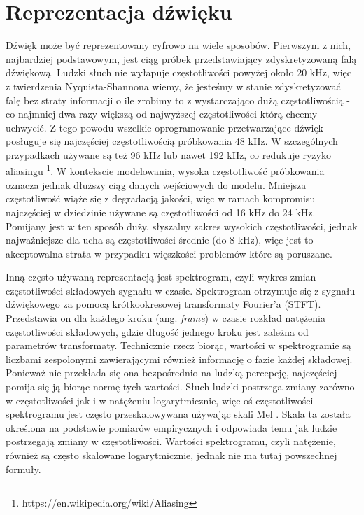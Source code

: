 \documentclass[magisterska]{pracamgr}
\begin{document}
\section{Reprezentacja dźwięku}

Dźwięk może być reprezentowany cyfrowo na wiele sposobów. Pierwszym z nich, najbardziej podstawowym, jest ciąg próbek przedstawiający zdyskretyzowaną falą dźwiękową. Ludzki słuch nie wyłapuje częstotliwości powyżej około 20 kHz, więc z twierdzenia Nyquista-Shannona \cite{shannon49} wiemy, że jesteśmy w stanie zdyskretyzować falę bez straty informacji o ile zrobimy to z wystarczająco dużą częstotliwością - co najmniej dwa razy większą od najwyższej częstotliwości którą chcemy uchwycić. Z tego powodu wszelkie oprogramowanie przetwarzające dźwięk posługuje się najczęściej częstotliwością próbkowania 48 kHz. W szczególnych przypadkach używane są też 96 kHz lub nawet 192 kHz, co redukuje ryzyko aliasingu \footnote{https://en.wikipedia.org/wiki/Aliasing}. W kontekscie modelowania, wysoka częstotliwość próbkowania oznacza jednak dłuższy ciąg danych wejściowych do modelu. Mniejsza częstotliwość wiąże się z degradacją jakości, więc w ramach kompromisu najczęściej w dziedzinie używane są częstotliwości od 16 kHz do 24 kHz. Pomijany jest w ten sposób duży, słyszalny zakres wysokich częstotliwości, jednak najważniejsze dla ucha są częstotliwości średnie (do 8 kHz), więc jest to akceptowalna strata w przypadku więszkości problemów które są poruszane.

Inną często używaną reprezentacją jest spektrogram, czyli wykres zmian częstotliwości składowych sygnału w czasie. Spektrogram otrzymuje się z sygnału dźwiękowego za pomocą krótkookresowej transformaty Fourier'a (STFT). Przedstawia on dla każdego kroku (ang. \textit{frame}) w czasie rozkład natężenia częstotliwości składowych, gdzie długość jednego kroku jest zależna od parametrów transformaty. Technicznie rzecz biorąc, wartości w spektrogramie są liczbami zespolonymi zawierającymi również informację o fazie każdej składowej. Ponieważ nie przekłada się ona bezpośrednio na ludzką percepcję, najczęściej pomija się ją biorąc normę tych wartości. Słuch ludzki postrzega zmiany zarówno w częstotliwości jak i w natężeniu logarytmicznie, więc oś częstotliwości spektrogramu jest często przeskalowywana używając skali Mel \cite{melscale}. Skala ta została określona na podstawie pomiarów empirycznych i odpowiada temu jak ludzie postrzegają zmiany w częstotliwości. Wartości spektrogramu, czyli natężenie, również są często skalowane logarytmicznie, jednak nie ma tutaj powszechnej formuły.
\end{document}
